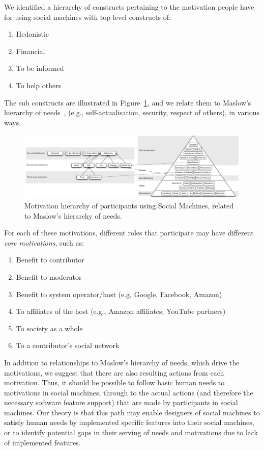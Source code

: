 \documentclass{sig-alternate}
\begin{document}
We identified a hierarchy of constructs pertaining to the motivation people have for using social
machines with top level constructs of:

\begin{enumerate}
\item Hedonistic
\item Financial
\item To be informed
\item To help others
\end{enumerate}

The sub constructs are illustrated in Figure~\ref{motivation}, and we relate them to Maslow's hierarchy of needs~\cite{maslow}, (e.g., self-actualisation, security, respect of others), in various ways.

\begin{figure}[htb]
\begin{center}
\includegraphics[width=18cm]{img/motivation.pdf}
\caption{Motivation hierarchy of participants using Social Machines, related to Maslow's hierarchy of needs.} \label{motivation}
\end{center}
\end{figure}

For each of these motivations, different roles that participate may have different {\it core motivations}, such as:

\begin{enumerate}
\item Benefit to contributor
\item Benefit to moderator
\item Benefit to system operator/host (e.g, Google, Facebook, Amazon)
\item To affiliates of the host (e.g., Amazon affiliates, YouTube partners)
\item To society as a whole
\item To a contributor's social network
\end{enumerate}

In addition to relationships to Maslow's hierarchy of needs, which drive the motivations,
we suggest that there are also resulting actions from each motivation. Thus, it should be
possible to follow basic human needs to motivations in social machines, through to the
actual actions (and therefore the necessary software feature support) that are made by
participants in social machines. Our theory is that this path may enable designers of
social machines to satisfy human needs by implemented specific features into their social
machines, or to identify potential gaps in their serving of needs and motivations due
to lack of implemented features.
\end{document}
